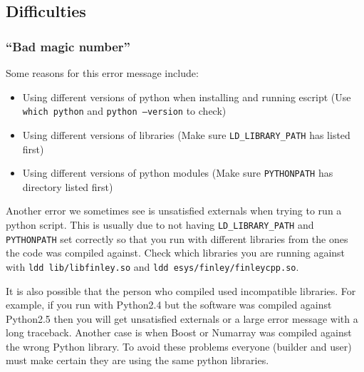 \subsection{Difficulties}

\subsubsection{``Bad magic number''}
Some reasons for this error message include:
\begin{itemize}
 \item Using different versions of python when installing and running escript (Use \texttt{which python} and \texttt{python --version} to check)
\item Using different versions of libraries (Make sure \texttt{LD_LIBRARY_PATH} has  listed first)
\item Using different versions of python modules (Make sure \texttt{PYTHONPATH} has  directory listed first) 
\end{itemize}

Another error we sometimes see is unsatisfied externals when trying to run a python script. This is usually due to not having \texttt{LD_LIBRARY_PATH} and \texttt{PYTHONPATH} set correctly so that you run with different libraries from the ones the code was compiled against. Check which libraries you are running against with \texttt{ldd lib/libfinley.so} and \texttt{ldd esys/finley/finleycpp.so}.

It is also possible that the person who compiled \esfinley used incompatible libraries. For example, if you run with Python2.4 but the software was compiled against Python2.5 then you will get unsatisfied externals or a large error message with a long traceback. Another case is when Boost or Numarray was compiled against the wrong Python library. To avoid these problems everyone (builder and user) must make certain they are using the same python libraries. 
